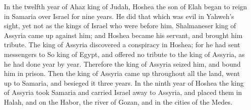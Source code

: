 \begin{paracol}{2}
\begin{otherlanguage}{english}
 In the twelfth year of Ahaz king of Judah, Hoshea the son
of Elah began to reign in Samaria over Israel for nine years.
 He did that which was evil in Yahweh's sight, yet not as
the kings of Israel who were before him.  Shalmaneser king
of Assyria came up against him; and Hoshea became his servant, and
brought him tribute.  The king of Assyria discovered a
conspiracy in Hoshea; for he had sent messengers to So king of Egypt,
and offered no tribute to the king of Assyria, as he had done year by
year. Therefore the king of Assyria seized him, and bound him in prison.
 Then the king of Assyria came up throughout all the land,
went up to Samaria, and besieged it three years.  In the
ninth year of Hoshea the king of Assyria took Samaria and carried Israel
away to Assyria, and placed them in Halah, and on the Habor, the river
of Gozan, and in the cities of the Medes.


\end{otherlanguage}
\end{paracol}
